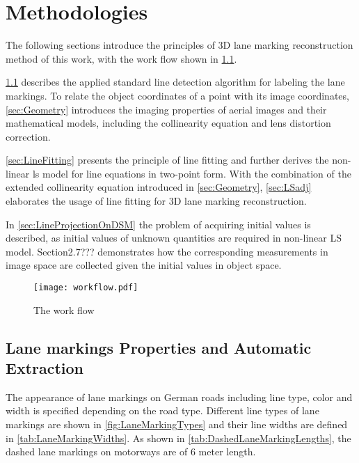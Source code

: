 
\chapter{Methodologies}
\label{chap:k2}

The following sections introduce the principles of 3D lane marking reconstruction method of this work, with the work flow shown in \cref{fig:FlowChart}.

\cref{sec:LineExtraction} describes the applied standard line detection algorithm for labeling the lane markings. To relate the object coordinates of a point with its image coordinates, \cref{sec:Geometry} introduces the imaging properties of aerial images and their mathematical models, including the collinearity equation and lens distortion correction.

\cref{sec:LineFitting} presents the principle of line fitting and further derives the non-linear \gls{ls} model for line equations in two-point form. With the combination of the extended collinearity equation introduced in \cref{sec:Geometry}, \cref{sec:LSadj} elaborates the usage of line fitting for 3D lane marking reconstruction.%

In \cref{sec:LineProjectionOnDSM} the problem of acquiring initial values is described, as initial values of unknown quantities are required in non-linear LS model. Section2.7??? demonstrates how the corresponding measurements in image space are collected given the initial values in object space.

\begin{figure}
  \centering
  \texttt{[image: workflow.pdf]}
  \caption{\small The work flow}
  \label{fig:FlowChart}
\end{figure}

\clearpage


\section{Lane markings Properties and Automatic Extraction}
\label{sec:LineExtraction}
The appearance of lane markings on German roads including line type, color and width is specified depending on the road type. Different line types of lane markings are shown in \cref{fig:LaneMarkingTypes} and their line widths are defined in \cref{tab:LaneMarkingWidths}. As shown in \cref{tab:DashedLaneMarkingLengths}, the dashed lane markings on motorways are of 6 meter length.

